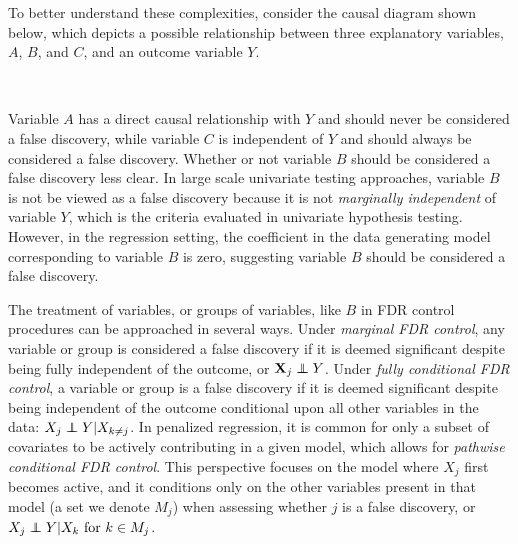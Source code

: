 To better understand these complexities, consider the causal diagram shown below, which depicts a possible relationship between three explanatory variables, $A$, $B$, and $C$, and an outcome variable $Y$.

\begin{center}
 \\
\end{center}

Variable $A$ has a direct causal relationship with $Y$ and should never be considered a false discovery, while variable $C$ is independent of $Y$ and should always be considered a false discovery. Whether or not variable $B$ should be considered a false discovery less clear. In large scale univariate testing approaches, variable $B$ is not be viewed as a false discovery because it is not \textit{marginally independent} of variable $Y$, which is the criteria evaluated in univariate hypothesis testing. However, in the regression setting, the coefficient in the data generating model corresponding to variable $B$ is zero, suggesting variable $B$ should be considered a false discovery.

The treatment of variables, or groups of variables, like $B$ in FDR control procedures can be approached in several ways. Under \textit{marginal FDR control}, any variable or group is considered a false discovery if it is deemed significant despite being fully independent of the outcome, or $\X_j \independent Y$. Under \textit{fully conditional FDR control}, a variable or group is a false discovery if it is deemed significant despite being independent of the outcome conditional upon all other variables in the data: $X_j \independent Y | X_{k \neq j}$. In penalized regression, it is common for only a subset of covariates to be actively contributing in a given model, which allows for \textit{pathwise conditional FDR control}. This perspective focuses on the model where $X_j$ first becomes active, and it conditions only on the other variables present in that model (a set we denote $M_j$) when assessing whether $j$ is a false discovery, or $X_j \independent Y | X_k \text{ for } k \in M_j$.

